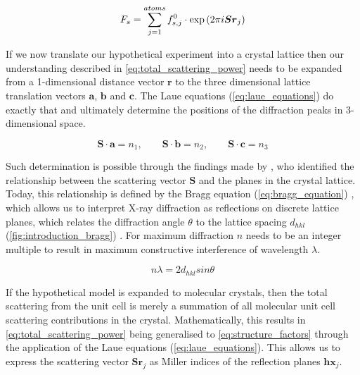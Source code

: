 \begin{equation}
    F_s=\sum_{j=1}^{atoms}f_{s,j}^0 \cdot \exp\left(2\pi\\i\boldsymbol{S}\boldsymbol{r}_j\right)
    \label{eq:total_scattering_power}
\end{equation}

If we now translate our hypothetical experiment into a crystal lattice then our understanding described in \cref{eq:total_scattering_power} needs to be expanded from a 1-dimensional distance vector $\boldsymbol{r}$ to the three dimensional lattice translation vectors $\boldsymbol{a}$, $\boldsymbol{b}$ and $\boldsymbol{c}$. The Laue equations (\cref{eq:laue_equations}) do exactly that and ultimately determine the positions of the diffraction peaks in 3-dimensional space.

\begin{equation}
    \boldsymbol{S} \cdot \boldsymbol{a}=n_1, \quad \quad \boldsymbol{S} \cdot \boldsymbol{b}=n_2, \quad \quad \boldsymbol{S} \cdot \boldsymbol{c}=n_3
    \label{eq:laue_equations}
\end{equation}

Such determination is possible through the findings made by \textcite{Bragg1913-cx}, who identified the relationship between the scattering vector $\boldsymbol{S}$ and the planes in the crystal lattice. Today, this relationship is defined by the Bragg equation (\cref{eq:bragg_equation}) \cite{Bragg1913-cx}, which allows us to interpret X-ray diffraction as reflections on discrete lattice planes, which relates the diffraction angle $\theta$ to the lattice spacing $d_{hkl}$ (\cref{fig:introduction_bragg}) \cite{Rupp2010-nc}. For maximum diffraction $n$ needs to be an integer multiple to result in maximum constructive interference of wavelength $\lambda$.

\begin{equation}
    n\lambda=2d_{hkl}sin\theta
    \label{eq:bragg_equation}
\end{equation}

If the hypothetical model is expanded to molecular crystals, then the total scattering from the unit cell is merely a summation of all molecular unit cell scattering contributions in the crystal. Mathematically, this results in \cref{eq:total_scattering_power} being generalised to \cref{eq:structure_factors} through the application of the Laue equations (\cref{eq:laue_equations}). This allows us to express the scattering vector $\boldsymbol{S}\boldsymbol{r}_j$ as Miller indices of the reflection planes $\boldsymbol{h}\boldsymbol{x}_j$.

